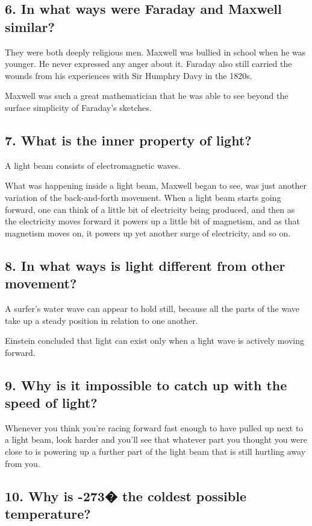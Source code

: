 \subsection*{6. In what ways were Faraday and Maxwell similar?}
They were both deeply religious men. Maxwell was bullied in school when he was younger. He never expressed any anger about it. Faraday also still carried the wounds from his experiences with Sir Humphry Davy in the 1820s.

Maxwell was such a great mathematician that he was able to see beyond the surface simplicity of Faraday's sketches.

\subsection*{7. What is the inner property of light?}
A light beam consists of electromagnetic waves.

What was happening inside a light beam, Maxwell began to see, was just another variation of the back-and-forth movement. When a light beam starts going forward, one can think of a little bit of electricity being produced, and then as the electricity moves forward it powers up a little bit of magnetism, and as that magnetism moves on, it powers up yet another surge of electricity, and so on.

\subsection*{8. In what ways is light different from other movement?}
A surfer's water wave can appear to hold still, because all the parts of the wave take up a steady position in relation to one another.

Einstein concluded that light can exist only when a light wave is actively moving forward.

\subsection*{9. Why is it impossible to catch up with the speed of light?}
Whenever you think you're racing forward fast enough to have pulled up next to a light beam, look harder and you'll see that whatever part you thought you were close to is powering up a further part of the light beam that is still hurtling away from you.

\subsection*{10. Why is -273� the coldest possible temperature?}

